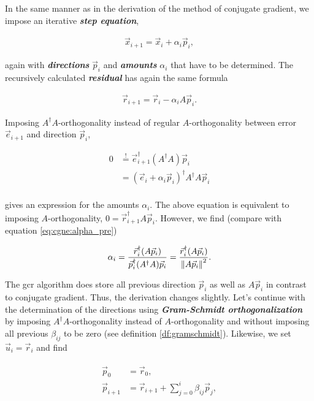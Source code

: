\documentclass{article}
\theoremstyle{plain} %
\theoremstyle{convention} %
\theoremstyle{remark} %
\def\df#1{\textbf{\textit{#1}}}
\numberwithin{equation}{section}
\begin{document}
In the same manner as in the derivation of the method of conjugate gradient, we impose an iterative \df{step equation},

\begin{align*}
    \vec{x}_{i+1} = \vec{x}_i + \alpha_i \vec{p}_i,
\end{align*}

again with \df{directions} $\vec{p}_i$ and \df{amounts} $\alpha_i$ that have to be determined. The recursively calculated \df{residual} has again the same formula

\begin{align*}
    \vec{r}_{i+1} = \vec{r}_i - \alpha_i A \vec{p}_i.
\end{align*}

Imposing $A^{\dagger} A$-orthogonality instead of regular $A$-orthogonality between error $\vec{e}_{i+1}$ and direction $\vec{p}_i$,

\begin{align*}
    0 &\stackrel{!}{=} \vec{e}_{i+1}^{\dagger} (A^{\dagger} A) \vec{p}_i \\
                    &= ( \vec{e}_{i} + \alpha_i \vec{p}_i )^{\dagger} A^{\dagger} A \vec{p}_i \\
\end{align*}

gives an expression for the amounts $\alpha_i$. The above equation is equivalent to imposing $A$-orthogonality, $0=\vec{r}_{i+1}^{\dagger} A \vec{p}_i$. However, we find (compare with equation \eqref{eq:cgne:alpha_pre})

\begin{align*}
      \alpha_i = \frac{ \vec{r}_i^{\dagger} (A \vec{p}_{i}) }{ \vec{p}_i^{\dagger} (A^{\dagger} A) \vec{p}_i } = \frac{ \vec{r}_i^{\dagger} (A \vec{p}_{i}) }{ \norm{A \vec{p}_i}^2 }.
\end{align*}

The \acrshort{gcr} algorithm does store all previous direction $\vec{p}_i$ as well as $A \vec{p}_i$ in contrast to conjugate gradient. Thus, the derivation changes slightly. Let's continue with the determination of the directions using \df{Gram-Schmidt orthogonalization} by imposing $A^{\dagger} A$-orthogonality instead of $A$-orthogonality and without imposing all previous $\beta_{ij}$ to be zero (see definition \ref{df:gramschmidt}). Likewise, we set $\vec{u}_i = \vec{r}_i$ and find

\begin{align*}
    \begin{split}
        \vec{p}_0 &= \vec{r}_0, \\
        \vec{p}_{i+1} &= \vec{r}_{i+1} + \sum_{j=0}^{i} \beta_{ij} \vec{p}_j,
    \end{split}
\end{align*}
\end{document}
